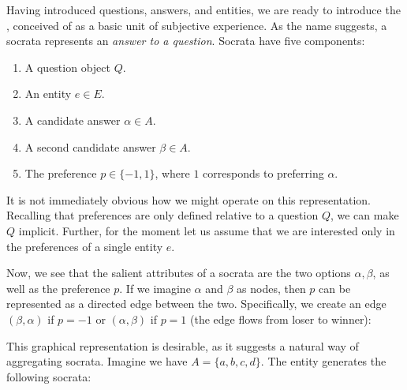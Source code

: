 \bigskip

Having introduced questions, answers, and entities, we are ready to introduce the , conceived of as a basic unit of subjective experience. As the name suggests, a socrata represents an \textit{answer to a question}. Socrata have five components:

\begin{enumerate}
	\item A question object $Q$.
	\item An entity $e \in E$.
	\item A candidate answer $\alpha \in A$.
	\item A second candidate answer $\beta \in A$.
	\item The preference $p \in \{-1, 1\}$, where $1$ corresponds to preferring $\alpha$.
\end{enumerate}

It is not immediately obvious how we might operate on this representation. Recalling that preferences are only defined relative to a question $Q$, we can make $Q$ implicit. Further, for the moment let us assume that we are interested only in the preferences of a single entity $e$.

Now, we see that the salient attributes of a socrata are the two options $\alpha, \beta$, as well as the preference $p$. If we imagine $\alpha$ and $\beta$ as nodes, then $p$ can be represented as a directed edge between the two. Specifically, we create an edge $(\beta, \alpha)$ if $p = -1$ or $(\alpha, \beta)$ if $p = 1$ (the edge flows from loser to winner):

\begin{center}
\end{center}

This graphical representation is desirable, as it suggests a natural way of aggregating socrata. Imagine we have $A = \{a, b, c, d\}$. The entity generates the following socrata:

\begin{center}





\end{center}

